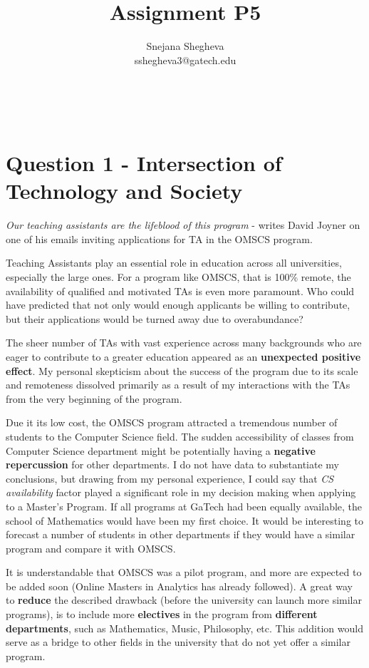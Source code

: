 \documentclass[12pt,letterpaper]{article}
\makeatletter
\renewcommand{\maketitle}{\bgroup
   \begin{center}
   \textbf{{\fontsize{18pt}{20}\selectfont \@title}}\\
   \vspace{10pt}
   {\fontsize{12pt}{0}\selectfont \@author} 
   \end{center}
}
\makeatother
\begin{document}
\title{Assignment P5}
\author{Snejana Shegheva \\ sshegheva3@gatech.edu}

\maketitle
\thispagestyle{fancy}

\section*{Question 1 - Intersection of Technology and Society}

\textit{Our teaching assistants are the lifeblood of this program} - writes David Joyner on one of his emails inviting applications for TA in the OMSCS program. 

Teaching Assistants play an essential role in education across all universities, especially the large ones. For a program like OMSCS, that is 100\% remote, the availability of qualified and motivated TAs is even more paramount. Who could have predicted that not only would enough applicants be willing to contribute, but their applications would be turned away due to overabundance?

The sheer number of TAs with vast experience across many backgrounds who are eager to contribute to a greater education appeared as an \textbf{unexpected positive effect}. My personal skepticism about the success of the program due to its scale and remoteness dissolved primarily as a result of my interactions with the TAs from the very beginning of the program. 

Due it its low cost, the OMSCS program attracted a tremendous number of students to the Computer Science field. The sudden accessibility of classes from Computer Science department might be potentially having a \textbf{negative repercussion} for other departments. I do not have data to substantiate my conclusions, but drawing from my personal experience, I could say that \textit{CS availability} factor played a significant role in my decision making when applying to a Master's Program. If all programs at GaTech had been equally available, the school of Mathematics would have been my first choice. It would be interesting to forecast a number of students in other departments if they would have a similar program and compare it with OMSCS.  

It is understandable that OMSCS was a pilot program, and more are expected to be added soon (Online Masters in Analytics has already followed). A great way to \textbf{reduce} the described drawback (before the university can launch more similar programs), is to include more \textbf{electives} in the program from \textbf{different departments}, such as Mathematics, Music, Philosophy, etc. This addition would serve as a bridge to other fields in the university that do not yet offer a similar program. 
\end{document}
